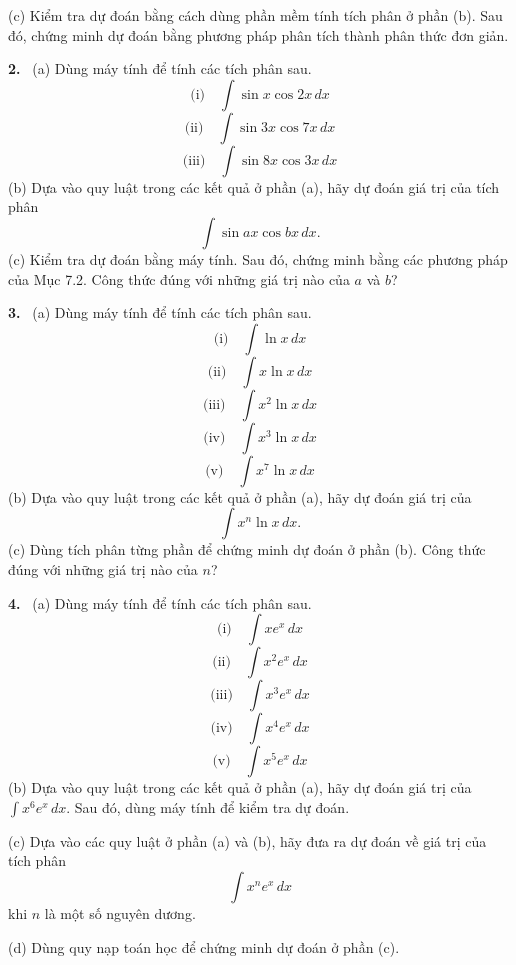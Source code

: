\documentclass[12pt,a4paper]{article}
\newcommand{\bt}[1]{\par\smallskip\Needspace{5\baselineskip}\noindent\textbf{#1.}\ }
\newcommand{\prj}[1]{\bt{#1}}
\begin{document}
(c) Kiểm tra dự đoán bằng cách dùng phần mềm tính tích phân ở phần (b). Sau đó, chứng minh dự đoán bằng phương pháp phân tích thành phân thức đơn giản.

\prj{2} (a) Dùng máy tính để tính các tích phân sau.
\[\text{(i)}\quad\int\sin x\cos2x\,dx\]
\[\text{(ii)}\quad\int\sin3x\cos7x\,dx\]
\[\text{(iii)}\quad\int\sin8x\cos3x\,dx\]
(b) Dựa vào quy luật trong các kết quả ở phần (a), hãy dự đoán giá trị của tích phân
\[\int\sin ax\cos bx\,dx.\]
(c) Kiểm tra dự đoán bằng máy tính. Sau đó, chứng minh bằng các phương pháp của Mục 7.2. Công thức đúng với những giá trị nào của $a$ và $b$?

\prj{3} (a) Dùng máy tính để tính các tích phân sau.
\[\text{(i)}\quad\int\ln x\,dx\]
\[\text{(ii)}\quad\int x\ln x\,dx\]
\[\text{(iii)}\quad\int x^2\ln x\,dx\]
\[\text{(iv)}\quad\int x^3\ln x\,dx\]
\[\text{(v)}\quad\int x^7\ln x\,dx\]
(b) Dựa vào quy luật trong các kết quả ở phần (a), hãy dự đoán giá trị của
\[\int x^n\ln x\,dx.\]
(c) Dùng tích phân từng phần để chứng minh dự đoán ở phần (b). Công thức đúng với những giá trị nào của $n$?

\prj{4} (a) Dùng máy tính để tính các tích phân sau.
\[\text{(i)}\quad\int xe^x\,dx\]
\[\text{(ii)}\quad\int x^2e^x\,dx\]
\[\text{(iii)}\quad\int x^3e^x\,dx\]
\[\text{(iv)}\quad\int x^4e^x\,dx\]
\[\text{(v)}\quad\int x^5e^x\,dx\]
(b) Dựa vào quy luật trong các kết quả ở phần (a), hãy dự đoán giá trị của $\int x^6e^x\,dx$. Sau đó, dùng máy tính để kiểm tra dự đoán.

(c) Dựa vào các quy luật ở phần (a) và (b), hãy đưa ra dự đoán về giá trị của tích phân
\[\int x^ne^x\,dx\]
khi $n$ là một số nguyên dương.

(d) Dùng quy nạp toán học để chứng minh dự đoán ở phần (c).
\end{document}
